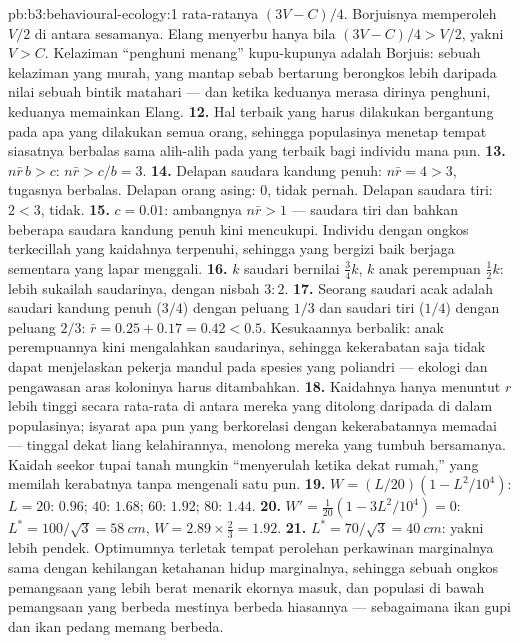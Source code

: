 \begin{solution}{pb:b3:behavioural-ecology:1}
rata-ratanya $(3V - C)/4$. Borjuisnya memperoleh $V/2$ di antara sesamanya. Elang menyerbu
hanya bila $(3V - C)/4 > V/2$, yakni $V > C$. Kelaziman ``penghuni
menang'' kupu-kupunya adalah Borjuis: sebuah kelaziman yang murah, yang mantap sebab bertarung berongkos
lebih daripada nilai sebuah bintik matahari --- dan ketika keduanya merasa dirinya
penghuni, keduanya memainkan Elang.
\textbf{12.} Hal terbaik yang harus dilakukan bergantung pada apa yang dilakukan semua orang,
sehingga populasinya menetap tempat siasatnya berbalas sama alih-alih pada
yang terbaik bagi individu mana pun.
\textbf{13.} $n\bar r\,b > c$: $n\bar r > c/b = 3$.
\textbf{14.} Delapan saudara kandung penuh: $n\bar r = 4 > 3$, tugasnya berbalas. Delapan
orang asing: $0$, tidak pernah. Delapan saudara tiri: $2 < 3$, tidak.
\textbf{15.} $c = 0.01$: ambangnya $n\bar r > 1$ --- saudara tiri dan
bahkan beberapa saudara kandung penuh kini mencukupi. Individu dengan ongkos terkecillah
yang kaidahnya terpenuhi, sehingga yang bergizi baik berjaga
sementara yang lapar menggali.
\textbf{16.} $k$ saudari bernilai $\tfrac{3}{4}k$, $k$ anak perempuan
$\tfrac{1}{2}k$: lebih sukailah saudarinya, dengan nisbah $3{:}2$.
\textbf{17.} Seorang saudari acak adalah saudari kandung penuh ($3/4$) dengan peluang
$1/3$ dan saudari tiri ($1/4$) dengan peluang $2/3$: $\bar r = 0.25 +
0.17 = 0.42 < 0.5$. Kesukaannya berbalik: anak perempuannya kini mengalahkan saudarinya,
sehingga kekerabatan saja tidak dapat menjelaskan pekerja mandul pada spesies yang
poliandri --- ekologi dan pengawasan aras koloninya harus ditambahkan.
\textbf{18.} Kaidahnya hanya menuntut $r$ lebih tinggi secara rata-rata di antara
mereka yang ditolong daripada di dalam populasinya; isyarat apa pun yang berkorelasi dengan kekerabatannya
memadai --- tinggal dekat liang kelahirannya, menolong mereka yang tumbuh bersamanya.
Kaidah seekor tupai tanah mungkin ``menyerulah ketika dekat rumah,'' yang memilah
kerabatnya tanpa mengenali satu pun.
\textbf{19.} $W = (L/20)(1 - L^{2}/10^{4})$: $L = 20$: $0.96$; $40$:
$1.68$; $60$: $1.92$; $80$: $1.44$.
\textbf{20.} $W' = \tfrac{1}{20}(1 - 3L^{2}/10^{4}) = 0$: $L^{*} = 100/\sqrt{3}
= \qty{58}{cm}$, $W = 2.89\times\tfrac{2}{3} = 1.92$.
\textbf{21.} $L^{*} = 70/\sqrt{3} = \qty{40}{cm}$: yakni lebih pendek. Optimumnya
terletak tempat perolehan perkawinan marginalnya sama dengan kehilangan ketahanan hidup marginalnya,
sehingga sebuah ongkos pemangsaan yang lebih berat menarik ekornya masuk, dan populasi di bawah
pemangsaan yang berbeda mestinya berbeda hiasannya --- sebagaimana ikan gupi dan
ikan pedang memang berbeda.

\end{solution}
